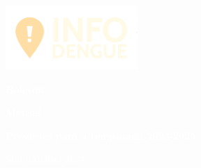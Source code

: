\pagecolor{UoDDarkBlue}\afterpage{\nopagecolor}


\includegraphics[width=5cm]{images/info_dengue_logo_reverted.png}
\vspace*{1cm}

\fontsize{70}{75}\selectfont \textcolor{white}{\textbf{Boletim}}

\fontsize{70}{75}\selectfont \textcolor{white}{\textbf{Mensal}}


\vspace{10mm}
\Large\textcolor{white}{\textbf{Previsões para a temporada 2024-2025}}

\vspace{120mm}

\normalsize
\textcolor{white}{SETEMBRO 2024}





\thispagestyle{empty}



\restoregeometry   
\newpage